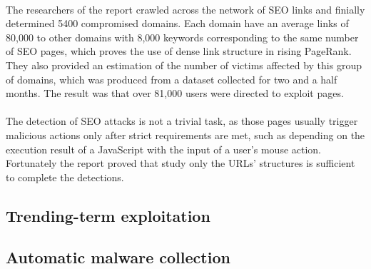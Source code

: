 \paragraph{} 
The
researchers of the report crawled across the network of SEO links and finially
determined 5400 compromised domains. Each domain have an average links of
80,000 to other domains with 8,000 keywords corresponding to the same number of
SEO pages, which proves the use of dense link structure in rising PageRank.
They also provided an estimation of the number of victims affected by this
group of domains, which was produced from a dataset collected for two and a
half months. The result was that over 81,000 users were directed to exploit
pages.
\paragraph{} 
The detection of SEO attacks is not a trivial task, as
those pages usually trigger malicious actions only after strict requirements
are met, such as depending on the execution result of a JavaScript with the
input of a user's mouse action. Fortunately the report proved that study only
the URLs' structures is sufficient to complete the detections. 


\subsection{Trending-term exploitation}


\subsection{Automatic malware collection}


